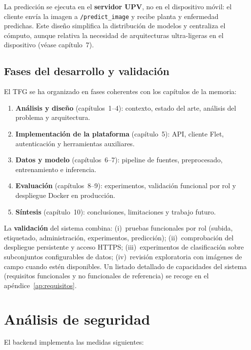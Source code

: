 \documentclass[11pt,spanish,listoffigures,listoftables]{tfgetsinf}
\begin{document}
La predicción se ejecuta en el \textbf{servidor UPV}, no en el dispositivo móvil: el cliente envía la imagen a \texttt{/predict\_image} y recibe planta y enfermedad predichas. Este diseño simplifica la distribución de modelos y centraliza el cómputo, aunque relativa la necesidad de arquitecturas ultra-ligeras en el dispositivo (véase capítulo~7).

\subsection{Fases del desarrollo y validación}

El TFG se ha organizado en fases coherentes con los capítulos de la memoria:

\begin{enumerate}
    \item \textbf{Análisis y diseño} (capítulos~1--4): contexto, estado del arte, análisis del problema y arquitectura.
    \item \textbf{Implementación de la plataforma} (capítulo~5): API, cliente Flet, autenticación y herramientas auxiliares.
    \item \textbf{Datos y modelo} (capítulos~6--7): pipeline de fuentes, preprocesado, entrenamiento e inferencia.
    \item \textbf{Evaluación} (capítulos~8--9): experimentos, validación funcional por rol y despliegue Docker en producción.
    \item \textbf{Síntesis} (capítulo~10): conclusiones, limitaciones y trabajo futuro.
\end{enumerate}

La \textbf{validación} del sistema combina: (i)~pruebas funcionales por rol (subida, etiquetado, administración, experimentos, predicción); (ii)~comprobación del despliegue persistente y acceso HTTPS; (iii)~experimentos de clasificación sobre subconjuntos configurables de datos; (iv)~revisión exploratoria con imágenes de campo cuando estén disponibles. Un listado detallado de capacidades del sistema (requisitos funcionales y no funcionales de referencia) se recoge en el apéndice~\ref{ap:requisitos}.

\section{Análisis de seguridad}

El backend implementa las medidas siguientes:
\end{document}
